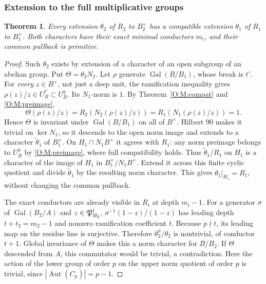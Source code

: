 \documentclass[11pt]{amsart}
\newtheorem{theorem}{Theorem}[section]
\theoremstyle{definition}
\theoremstyle{remark}
\newcommand{\Gal}{\operatorname{Gal}}
\begin{document}
\subsubsection*{Extension to the full multiplicative groups}
\begin{theorem}\label{O:M:global}
Every extension $\theta_2$ of $R_2$ to $B_2^\times$ has a compatible
extension $\theta_1$ of $R_1$ to $B_1^\times$. Both characters have their
exact minimal conductors $m_i$, and their common pullback is primitive.
\end{theorem}
\begin{proof}
Such $\theta_2$ exists by extension of a character of an open subgroup of
an abelian group. Put $\Theta=\theta_2N_2$.
Let $\rho$ generate $\Gal(B/B_1)$, whose break is $t'$.
For \emph{every} $z\in B^\times$, not just a deep unit, the ramification
inequality gives $\rho(z)/z\in U_B^{t'}\subset U_B^q$.
Its $N_1$-norm is $1$. By Theorem~\ref{O:M:compat} and \eqref{O:M:preimage},
\[
 \Theta(\rho(z)/z)=R_2(N_2(\rho(z)/z))
                 =R_1(N_1(\rho(z)/z))=1.
\]
Hence $\Theta$ is invariant under $\Gal(B/B_1)$ on all of $B^\times$.
Hilbert 90 makes it trivial on $\ker N_1$, so it descends to the open norm
image and extends to a character $\widetilde\theta_1$ of $B_1^\times$.
On $H_1\cap N_1B^\times$ it agrees with $R_1$: any norm preimage belongs to
$U_B^q$ by \eqref{O:M:preimage}, where full compatibility holds.
Thus $\widetilde\theta_1/R_1$ on $H_1$ is a character of the image of $H_1$
in $B_1^\times/N_1B^\times$. Extend it across this finite cyclic quotient
and divide $\widetilde\theta_1$ by the resulting norm character. This gives
$\theta_1|_{H_1}=R_1$, without changing the common pullback.

The exact conductors are already visible in $R_i$ at depth $m_i-1$.
For a generator $\sigma$ of $\Gal(B_2/A)$ and $z\in\mathfrak P_{B_2}^t$,
$\sigma^{-1}(1-z)/(1-z)$ has leading depth $t+t_2=m_2-1$ and nonzero
ramification coefficient $t$. Because $p\nmid t$, its leading map on the
residue line is surjective. Therefore
$\theta_2^\sigma/\theta_2$ is nontrivial, of conductor $t+1$.
Global invariance of $\Theta$ makes this a norm character for $B/B_2$.
If $\Theta$ descended from $A$, this commutator would be trivial, a
contradiction. Here the action of the lower group of order $p$ on the
upper norm quotient of order $p$ is trivial, since
$|\operatorname{Aut}(C_p)|=p-1$.
\end{proof}
\end{document}
